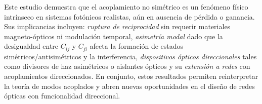 Este estudio demuestra que el acoplamiento no simétrico es un fenómeno físico intrínseco en sistemas fotónicos realistas, aún en ausencia de pérdida o ganancia. Sus implicancias incluyen: \textit{ruptura de reciprocidad} sin requerir materiales magneto-ópticos ni modulación temporal, \textit{asimetría modal} dado que la desigualdad entre \( C_{ij} \) y \( C_{ji} \) afecta la formación de estados simétricos/antisimétricos y la interferencia, \textit{dispositivos ópticos direccionales} tales como divisores de haz asimétricos o aislantes ópticos y su \textit{extensión a redes} con acoplamientos direccionados. En conjunto, estos resultados permiten reinterpretar la teoría de modos acoplados y abren nuevas oportunidades en el diseño de redes ópticas con funcionalidad direccional.

